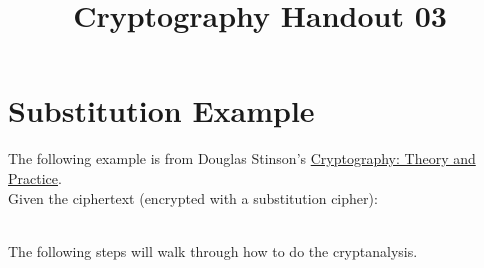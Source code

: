 \documentclass[12pt]{amsart}
\makeatletter
\def\subtitle#1{\gdef\@subtitle{#1}}
\def\@subtitle{}
\theoremstyle{plain}
\theoremstyle{definition}
\theoremstyle{remark}
\makeatother
\begin{document}
\onehalfspacing

\title[]{Cryptography Handout 03}
\subtitle{Substitution Cipher}
\maketitle


\section*{Substitution Example}
The following example is from Douglas Stinson's \underline{Cryptography: Theory and Practice}.\\

Given the ciphertext (encrypted with a substitution cipher):

\\

The following steps will walk through how to do the cryptanalysis.\\
\end{document}
